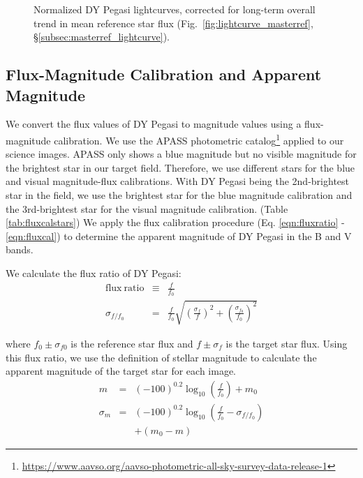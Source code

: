 \documentclass[twocolumn]{aastex631}
\begin{document}
\begin{figure}
\caption{Normalized DY Pegasi lightcurves, corrected for long-term overall trend in mean reference star flux (Fig.\ \ref{fig:lightcurve_masterref}, \S \ref{subsec:masterref_lightcurve}). \label{fig:normlightcurve_target}}
\end{figure}

\subsection{Flux-Magnitude Calibration and Apparent Magnitude \label{subsec:fluxmagcal}}

We convert the flux values of DY Pegasi to magnitude values using a flux-magnitude calibration. We use the APASS photometric catalog\footnote{\url{https://www.aavso.org/aavso-photometric-all-sky-survey-data-release-1}} applied to our science images. APASS only shows a blue magnitude but no visible magnitude for the brightest star in our target field. Therefore, we use different stars for the blue and  visual magnitude-flux calibrations. With DY Pegasi being the 2nd-brightest star in the field, we use the brightest star for the blue magnitude calibration and the 3rd-brightest star for the visual magnitude calibration. (Table \ref{tab:fluxcalstars}) We apply the flux calibration procedure (Eq. \ref{eqn:fluxratio} - \ref{eqn:fluxcal}) to determine the apparent magnitude of DY Pegasi in the B and V bands.

We calculate the flux ratio of DY Pegasi:
\begin{eqnarray}
\mathrm{flux \ ratio} &\equiv& \frac{f}{f_0} \label{eqn:fluxratio} \\
\sigma_{f/f_0} &=& \frac{f}{f_0} \sqrt{ \left( \frac{\sigma_f}{f} \right)^2 + \left( \frac{\sigma_{f_0}}{f_0} \right)^2 }
\end{eqnarray}

where $f_0 \pm \sigma_{f0}$ is the reference star flux and $f \pm \sigma_f$ is the target star flux. Using this flux ratio, we use the definition of stellar magnitude \citep{vdl_2022_2} to calculate the apparent magnitude of the target star for each image.
\begin{eqnarray}
    m &=& (-100)^{0.2} \log_{10} \left( \frac{f}{f_0} \right) + m_0 \\
    \sigma_m &=& (-100)^{0.2} \log_{10} \left( \frac{f}{f_0} - \sigma_{f/f_0} \right) \label{eqn:fluxcal} \\
    &\ & + (m_0 - m)
\end{eqnarray}
\end{document}
